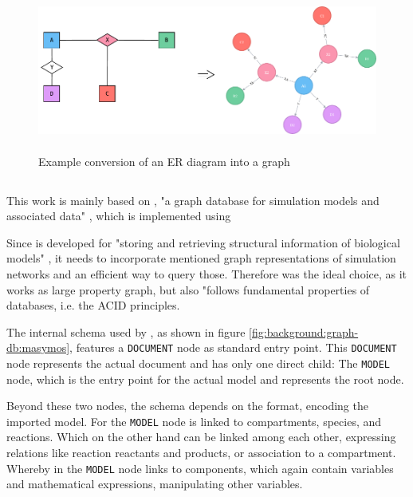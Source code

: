 \begin{figure}
	\center
	\includegraphics[height=150pt]{resources/er-to-neo4j.pdf}
	\caption{Example conversion of an ER diagram into a \neoj graph}
	
	
	\label{fig:example-er-diagram}
\end{figure}

\subsection{\masymos}
\label{sec:background:graph-db:masymos}

This work is mainly based on \masymos, "a graph database for simulation models and associated data" \citep{Henkel2015}, which is implemented using \neoj \citep{Robinson2013}

Since \masymos is developed for "storing and retrieving structural information of biological models" \citep{Henkel2015}, it needs to incorporate mentioned graph representations of simulation networks and an efficient way to query those. Therefore \neoj was the ideal choice, as it works as large property graph, but also "follows fundamental properties of databases, i.e. the ACID principles. \citep{Henkel2015}

The internal schema used by \masymos, as shown in figure \ref{fig:background:graph-db:masymos}, features a \texttt{DOCUMENT} node as standard entry point. This \texttt{DOCUMENT} node represents the actual \xml document and has only one direct child: The \texttt{MODEL} node, which is the entry point for the actual model and represents the \xml root node.

Beyond these two nodes, the schema depends on the format, encoding the imported model. For \sbml the \texttt{MODEL} node is linked to compartments, species, and reactions. Which on the other hand can be linked among each other, expressing relations like reaction reactants and products, or association to a compartment.
Whereby in \cellml the \texttt{MODEL} node links to components, which again contain variables and mathematical expressions, manipulating other variables.

